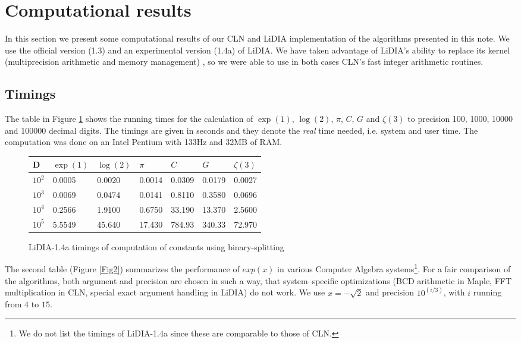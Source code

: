 \section{Computational results}

In this section we present some computational results of our CLN and
{\sf LiDIA} implementation of the algorithms presented in this note. We use
the official version (1.3) and an experimental version (1.4a) of {\sf LiDIA}.
We have taken advantage of {\sf LiDIA}'s ability to replace its kernel
(multiprecision arithmetic and memory management) \cite{95,97,97b}, so we were
able to use in both cases CLN's fast integer arithmetic routines.

\subsection{Timings}

The table in Figure \ref{Fig1} shows the running times for the calculation of
\( \exp(1) \), \( \log(2) \), \( \pi \), \( C \), \( G \) and \( \zeta(3) \)
to precision 100, 1000, 10000 and 100000 decimal digits. The timings are given
in seconds and they denote the {\em real} time needed, i.e. system and user
time. The computation was done on an Intel Pentium with 133Hz and 32MB of RAM.

\begin{figure}[htb]
\begin{center}
\begin{tabular}{|l|l|l|l|l|l|l|}
\hline
D      &\( \exp(1) \)&\( \log(2) \)&\( \pi \)&\( C \)  &\( G \)&\( \zeta(3) \)\\
\hline
\hline
\( 10^2 \) &0.0005   & 0.0020      &0.0014   & 0.0309  &0.0179 & 0.0027 \\
\hline
\( 10^3 \) &0.0069   & 0.0474      &0.0141   & 0.8110  &0.3580 & 0.0696 \\
\hline
\( 10^4 \) &0.2566   & 1.9100      &0.6750   & 33.190  &13.370 & 2.5600 \\
\hline
\( 10^5 \) &5.5549   & 45.640      &17.430   & 784.93  &340.33 & 72.970 \\
\hline
\end{tabular}
\caption{{\sf LiDIA-1.4a} timings of computation of constants using
binary-splitting}\label{Fig1}
\end{center}
\end{figure}

The second table (Figure \ref{Fig2}) summarizes the performance of
\( exp(x) \) in various Computer Algebra systems\footnote{We do not list
the timings of {\sf LiDIA-1.4a} since these are comparable to those of CLN.}.
For a fair comparison of the algorithms, both argument and precision are
chosen in such a way, that system--specific optimizations (BCD arithmetic
in Maple, FFT multiplication in CLN, special exact argument handling in 
{\sf LiDIA}) do not work. We use \( x = -\sqrt{2} \) and precision 
\( 10^{(i/3)} \), with \( i \) running from \( 4 \) to \( 15 \).

